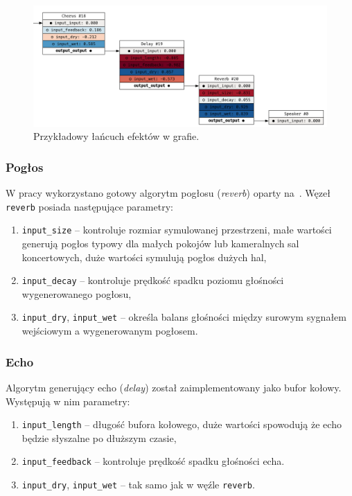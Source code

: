 \begin{figure}[H]
    \centering
    \includegraphics[width=1.0\linewidth]{rys06/example_generated_effects.png}
    \caption{
      Przykładowy łańcuch efektów w grafie.
    }\label{fig:example_generated_effects}
\end{figure}

\subsubsection{Pogłos}

W pracy wykorzystano gotowy algorytm pogłosu (\textit{reverb}) oparty na~\cite{reverb}.
Węzeł \texttt{reverb} posiada następujące parametry:
\begin{enumerate}
  \item \texttt{input\_size} -- kontroluje rozmiar symulowanej przestrzeni, małe
    wartości generują pogłos typowy dla małych pokojów lub kameralnych sal koncertowych,
    duże wartości symulują pogłos dużych hal,
  \item \texttt{input\_decay} -- kontroluje prędkość spadku poziomu
    głośności wygenerowanego pogłosu,
  \item \texttt{input\_dry}, \texttt{input\_wet} -- określa balans głośności
    między surowym sygnałem wejściowym a wygenerowanym pogłosem.
\end{enumerate}

\subsubsection{Echo}

Algorytm generujący echo (\textit{delay}) został zaimplementowany jako bufor kołowy. Występują
w nim parametry:
\begin{enumerate}
  \item \texttt{input\_length} -- długość bufora kołowego, duże wartości spowodują
    że echo będzie słyszalne po dłuższym czasie,
  \item \texttt{input\_feedback} -- kontroluje prędkość spadku głośności echa.
  \item \texttt{input\_dry}, \texttt{input\_wet} -- tak samo jak w węźle \texttt{reverb}.
\end{enumerate}

